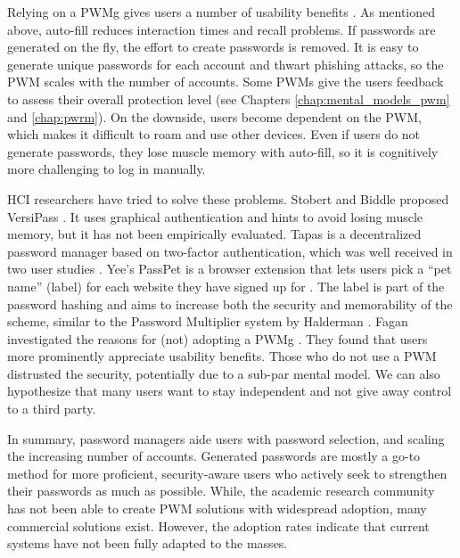 	Relying on a \gls{PWMg} gives users a number of usability benefits \cite{Yee2006Passpet}. As mentioned above, auto-fill reduces interaction times and recall problems. If passwords are generated on the fly, the effort to create passwords is removed. It is easy to generate unique passwords for each account and thwart phishing attacks, so the \gls{PWM} scales with the number of accounts. Some \glspl{PWM} give the users feedback to assess their overall protection level (see Chapters \ref{chap:mental_models_pwm} and \ref{chap:pwrm}). 
	On the downside, users become dependent on the \gls{PWM}, which makes it difficult to roam and use other devices. Even if users do not generate passwords, they lose muscle memory with auto-fill, so it is cognitively more challenging to log in manually.
	
	HCI researchers have tried to solve these problems. Stobert and Biddle proposed VersiPass \cite{Stobert2014PWMThatDoesntRemember}. It uses graphical authentication and hints to avoid losing muscle memory, but it has not been empirically evaluated. Tapas is a decentralized password manager based on two-factor authentication, which was well received in two user studies \cite{McCarney2012Tapas, McCarney2013PWMThesis}. Yee's PassPet is a browser extension that lets users pick a ``pet name'' (label) for each website they have signed up for \cite{Yee2006Passpet}. The label is part of the password hashing and aims to increase both the security and memorability of the scheme, similar to the Password Multiplier system by Halderman \etal \cite{Halderman2005ConvenientPWM}. Fagan \etal investigated the reasons for (not) adopting a \gls{PWMg} \cite{Fagan2017UsersConsiderationsPWMs}. They found that users more prominently appreciate usability benefits. Those who do not use a \gls{PWM} distrusted the security, potentially due to a sub-par mental model. We can also hypothesize that many users want to stay independent and not give away control to a third party. 
	
	In summary, password managers aide users with password selection, and scaling the increasing number of accounts. Generated passwords are mostly a go-to method for more proficient, security-aware users who actively seek to strengthen their passwords as much as possible. While, the academic research community has not been able to create PWM solutions with widespread adoption, many commercial solutions exist. However, the adoption rates indicate that current systems have not been fully adapted to the masses. 
	
